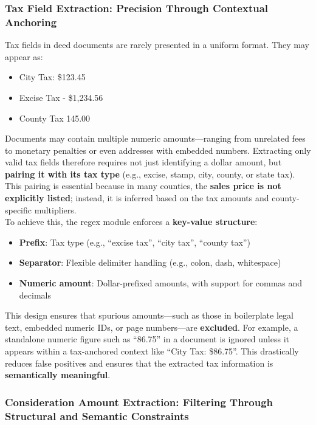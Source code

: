 \documentclass{article}
\begin{document}
\subsubsection{Tax Field Extraction: Precision Through Contextual Anchoring}

Tax fields in deed documents are rarely presented in a uniform format. They may appear as:
\begin{itemize}
    \item City Tax: \$123.45
    \item Excise Tax - \$1,234.56
    \item County Tax 145.00
\end{itemize}

Documents may contain multiple numeric amounts---ranging from unrelated fees to monetary penalties or even addresses with embedded numbers. Extracting only valid tax fields therefore requires not just identifying a dollar amount, but \textbf{pairing it with its tax type} (e.g., excise, stamp, city, county, or state tax). This pairing is essential because in many counties, the \textbf{sales price is not explicitly listed}; instead, it is inferred based on the tax amounts and county-specific multipliers. \\

To achieve this, the regex module enforces a \textbf{key-value structure}:
\begin{itemize}
    \item \textbf{Prefix}: Tax type (e.g., ``excise tax'', ``city tax'', ``county tax'')
    \item \textbf{Separator}: Flexible delimiter handling (e.g., colon, dash, whitespace)
    \item \textbf{Numeric amount}: Dollar-prefixed amounts, with support for commas and decimals
\end{itemize}

This design ensures that spurious amounts---such as those in boilerplate legal text, embedded numeric IDs, or page numbers---are \textbf{excluded}. For example, a standalone numeric figure such as ``86.75'' in a document is ignored unless it appears within a tax-anchored context like ``City Tax: \$86.75''. This drastically reduces false positives and ensures that the extracted tax information is \textbf{semantically meaningful}. \\

\subsubsection{Consideration Amount Extraction: Filtering Through Structural and Semantic Constraints}
\end{document}
